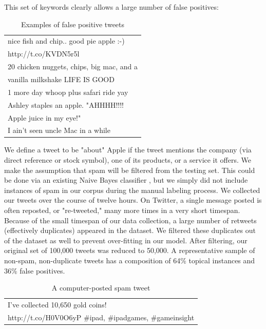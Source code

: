 \documentclass[letterpaper]{article}
\begin{document}
This set of keywords clearly allows a large number of false positives:

\begin{table}[h]
\centering
\begin{tabular}{|l|}
	\hline
	nice fish and chip.. good pie apple :-) \\ http://t.co/KVDN5r5l \\ \hline
	20 chicken nuggets, chips, big mac, and a \\ vanilla milkshake LIFE IS GOOD \\ \hline
	1 more day whoop plus safari ride yay \\ \hline
	Ashley staples an apple.  "AHHHH!!!! \\ Apple juice in my eye!" \\ \hline
	I ain't seen uncle Mac in a while \\
	\hline
\end{tabular}
\caption{Examples of false positive tweets}
\label{tab:myfirsttable}
\end{table}


We define a tweet to be "about" Apple if the tweet mentions the company (via direct reference or stock symbol), one of its products, or a service it offers. We make the assumption that spam will be filtered from the testing set. This could be done via an existing Naive Bayes classifier %
, but we simply did not include instances of spam in our corpus during the manual labeling process. We collected our tweets over the course of twelve hours. On Twitter, a single message posted is often reposted, or "re-tweeted," many more times in a very short timespan. Because of the small timespan of our data collection, a large number of retweets (effectively duplicates) appeared in the dataset. We filtered these duplicates out of the dataset as well to prevent over-fitting in our model. After filtering, our original set of 100,000 tweets was reduced to 50,000. A representative sample of non-spam, non-duplicate tweets has a composition of 64\% topical instances and 36\% false positives.

\begin{table}[h]
\centering
\begin{tabular}{|l|}
	\hline
	I've collected 10,650 gold coins! \\ http://t.co/H0V0O6yP \#ipad, \#ipadgames, \#gameinsight\\
	\hline
\end{tabular}
\caption{A computer-posted spam tweet}
\end{table}
\end{document}
